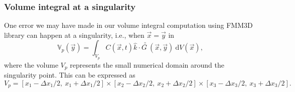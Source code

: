 \subsubsection{Volume integral at a singularity}
One error we may have made in our volume integral computation using FMM3D library can happen at a singularity, i.e., when $\vec{x} = \vec{y}$ in 
\begin{equation}
\mathbb{V}_p(\vec{y}) = 
 \int_{{V}_p}
	C (\vec{x},t ) \hat{k} \cdot 
	\bar{\bar{G \ }} (\vec{x}, \vec{y} ) 
	\ \text{d}V(\vec{x}),
	\label{eq_vol_int_singular}
\end{equation}
where the volume $V_p$ represents the small numerical domain around the singularity point. This can be expressed as 
\[
V_p = [x_1 - \Delta x_1/2, \ x_1 + \Delta x_1/2]
\times [x_2 - \Delta x_2/2, \ x_2 + \Delta x_2/2]
\times [x_3 - \Delta x_3/2, \ x_3 + \Delta x_3/2].
\]
